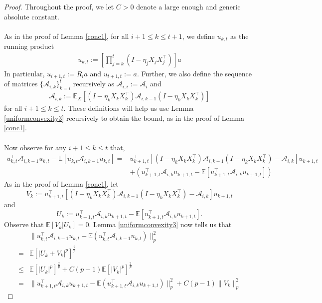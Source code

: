 \documentclass[11pt, reqno,english]{amsart}
\begin{document}
\begin{proof}
Throughout the proof, we let $C > 0$ denote a large enough and generic absolute constant.
\\\\
As in the proof of Lemma \ref{conc1}, for all $i+1 \leq k \leq t+1$, we define $u_{k,t}$ as the running product
\begin{align*}
u_{k,t} := [\prod_{j = k}^{t}(I - \eta_{j}X_{j}X^\top_{j})]a
\end{align*}
In particular, $u_{i+1,t} := R_ia$ and $u_{t+1,t} := a$. Further, we also define the sequence of matrices $\{\mathcal A_{i,k}\}_{k = i}^{t}$ recursively as $\mathcal A_{i,i} := \mathcal A_i$ and 
\begin{align*}
\mathcal A_{i,k} := \mathbb{E}_{X}[(I - \eta_{k}X_kX_k^\top)\mathcal A_{i,k-1} (I - \eta_{k}X_kX_k^\top)]
\end{align*}
for all $i+1 \leq k \leq t$. These definitions will help us use Lemma \ref{uniformconvexity3} recursively to obtain the bound, as in the proof of Lemma \ref{conc1}. 
\\\\
Now observe for any $i+1 \leq k \leq t$ that,
\begin{align*}
u^\top_{k,t} \mathcal A_{i,k-1} u_{k,t} - \mathbb{E}[u^\top_{k,t} \mathcal A_{i,k-1} u_{k,t}] = &u^\top_{k+1,t}[(I - \eta_k X_kX_k^\top)\mathcal A_{i,k-1} (I - \eta_k X_kX_k^\top) - \mathcal A_{i,k}]u_{k+1,t} 
\\
&+ (u^\top_{k+1,t}\mathcal A_{i,k} u_{k+1,t} - \mathbb{E}[u^\top_{k+1,t}\mathcal A_{i,k} u_{k+1,t}])
\end{align*}
As in the proof of Lemma \ref{conc1}, let $$V_k := u^\top_{k+1,t}[(I - \eta_kX_kX_k^\top)\mathcal A_{i,k-1}(I - \eta_kX_kX_k^\top) - \mathcal A_{i,k}
]u_{k+1,t}$$ and $$U_k:= u^\top_{k+1,t} \mathcal A_{i,k}u_{k+1,t} - \mathbb{E}[u^\top_{k+1,t}\mathcal A_{i,k} u_{k+1,t}].$$ Observe that $\mathbb{E}[V_k|U_k] = 0$. Lemma \ref{uniformconvexity3} now tells us that
\begin{align*}
& \|u_{k,t}^\top \mathcal A_{i,k-1} u_{k,t} - \mathbb{E}(u^\top_{k,t} \mathcal A_{i,k-1} u_{k,t})\|^2_p\\
= & \mathbb{E}[|U_k + V_k|^p]^{\frac{2}{p}} 
\\
 \leq  & \mathbb{E}[|U_k|^p]^{\frac{2}{p}} + C(p-1)\mathbb{E}[|V_k|^p]^{\frac{2}{p}}
 \\
 = & \|u^\top_{k+1,t}\mathcal A_{i,k}u_{k+1,t} - \mathbb{E}(u^\top_{k+1,t} \mathcal A_{i,k} u_{k+1,t})\|^2_p + C(p-1)\|V_k\|^2_p
\end{align*}

\end{proof}
\end{document}
